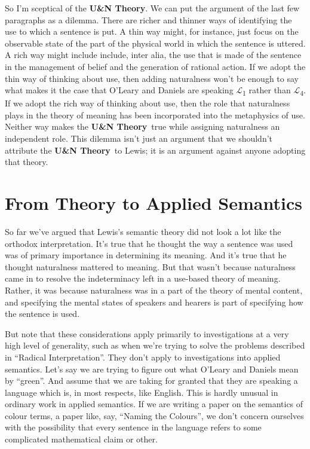 \documentclass[
  11pt,
  letterpaper,
  DIV=11,
  numbers=noendperiod,
  twoside]{scrartcl}
\begin{document}
So I'm sceptical of the \textbf{U\&N Theory}. We can put the argument of
the last few paragraphs as a dilemma. There are richer and thinner ways
of identifying the use to which a sentence is put. A thin way might, for
instance, just focus on the observable state of the part of the physical
world in which the sentence is uttered. A rich way might include
include, inter alia, the use that is made of the sentence in the
management of belief and the generation of rational action. If we adopt
the thin way of thinking about use, then adding naturalness won't be
enough to say what makes it the case that O'Leary and Daniels are
speaking \(\mathcal{L}\)\textsubscript{1} rather than
\(\mathcal{L}\)\textsubscript{4}. If we adopt the rich way of thinking
about use, then the role that naturalness plays in the theory of meaning
has been incorporated into the metaphysics of use. Neither way makes the
\textbf{U\&N Theory}~true while assigning naturalness an independent
role. This dilemma isn't just an argument that we shouldn't attribute
the \textbf{U\&N Theory}~to Lewis; it is an argument against anyone
adopting that theory.

\section{From Theory to Applied
Semantics}\label{from-theory-to-applied-semantics}

So far we've argued that Lewis's semantic theory did not look a lot like
the orthodox interpretation. It's true that he thought the way a
sentence was used was of primary importance in determining its meaning.
And it's true that he thought naturalness mattered to meaning. But that
wasn't because naturalness came in to resolve the indeterminacy left in
a use-based theory of meaning. Rather, it was because naturalness was in
a part of the theory of mental content, and specifying the mental states
of speakers and hearers is part of specifying how the sentence is used.

But note that these considerations apply primarily to investigations at
a very high level of generality, such as when we're trying to solve the
problems described in ``Radical Interpretation''. They don't apply to
investigations into applied semantics. Let's say we are trying to figure
out what O'Leary and Daniels mean by ``green''. And assume that we are
taking for granted that they are speaking a language which is, in most
respects, like English. This is hardly unusual in ordinary work in
applied semantics. If we are writing a paper on the semantics of colour
terms, a paper like, say, ``Naming the Colours'', we don't concern
ourselves with the possibility that every sentence in the language
refers to some complicated mathematical claim or other.
\end{document}

